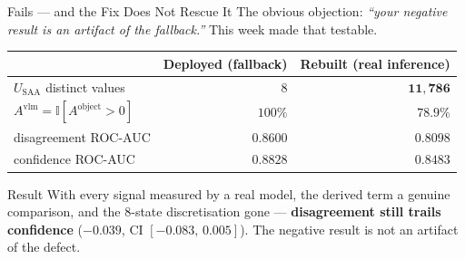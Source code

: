 \documentclass[aspectratio=169,11pt]{beamer}
\begin{document}
\begin{frame}{Fails --- and the Fix Does Not Rescue It}
\small
The obvious objection: \emph{``your negative result is an artifact of the fallback.''} This week made that testable.
\vspace{1mm}
\begin{center}
\footnotesize
\begin{tabular}{@{}l r r@{}}
\toprule
& \textbf{Deployed (fallback)} & \textbf{Rebuilt (real inference)} \\
\midrule
$U_{\text{SAA}}$ distinct values & $8$ & $\mathbf{11{,}786}$ \\
$A^{\text{vlm}} = \mathbb{I}[A^{\text{object}}>0]$ & $100\%$ & $78.9\%$ \\
disagreement ROC-AUC & $0.8600$ & $0.8098$ \\
confidence ROC-AUC & $0.8828$ & $0.8483$ \\
\bottomrule
\end{tabular}
\end{center}
\vspace{1mm}
\begin{alertblock}{\small Result}
\footnotesize With every signal measured by a real model, the derived term a genuine comparison, and the 8-state discretisation gone --- \textbf{disagreement still trails confidence} ($-0.039$, CI $[-0.083,\,0.005]$). The negative result is not an artifact of the defect.
\end{alertblock}
\end{frame}
\end{document}

